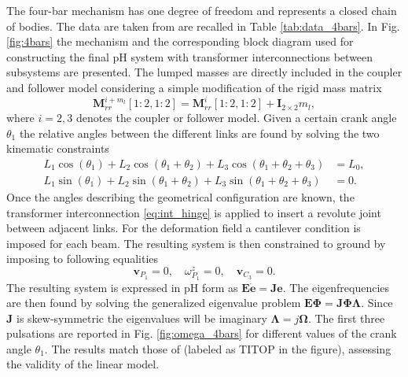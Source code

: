 \documentclass{svjour3}                     %
\newcommand{\firstRev}[1]{\textcolor{red!80!black}{#1}}
\begin{document}
	The four-bar mechanism has one degree of freedom and represents a closed chain of bodies. The data are taken from \cite{KITIS1990267,Chebbi2017} are recalled in Table \ref{tab:data_4bars}. In Fig. \ref{fig:4bars} the mechanism and the corresponding block diagram used for constructing the final pH system with transformer interconnections between subsystems are presented. The lumped masses are directly included in the coupler and follower model considering a simple modification of the rigid mass matrix
	\begin{equation*}
	\mathbf{M}_{rr}^{i + m_l}[1:2,1:2] = \mathbf{M}_{rr}^{i}[1:2,1:2] + \mathbf{I}_{2\times 2} m_l,
	\end{equation*} 
	where $i=2,3$ denotes the coupler or follower model. Given a certain crank angle $\theta_1$ the relative angles between the different links are found by solving the two kinematic constraints
	\begin{align*}
	L_1 \cos(\theta_1)+ L_2 \cos(\theta_1+\theta_2)+ L_3 \cos(\theta_1+\theta_2+\theta_3) &=L_0, \\
	L_1 \sin(\theta_1)+L_2 \sin(\theta_1+\theta_2)+L_3 \sin(\theta_1+\theta_2+\theta_3) &=0.
	\end{align*} 
	Once the angles describing the geometrical configuration are known, the transformer interconnection \eqref{eq:int_hinge} is applied to insert a revolute joint between adjacent links. For the deformation field a cantilever condition is imposed for each beam. The resulting system is then constrained to ground by imposing to following equalities
	\begin{equation*}
	\mathbf{v}_{P_1} = 0, \quad \omega^z_{P_1} = 0, \quad \mathbf{v}_{C_3} = 0.
	\end{equation*}
	The resulting system is expressed in pH form as $\mathbf{E}\dot{\mathbf{e}} = \mathbf{J} \mathbf{e}$. The eigenfrequencies are then found by solving the generalized eigenvalue problem $\mathbf{E}\bm{\Phi} = \mathbf{J} \bm{\Phi \Lambda}$. Since $\mathbf{J}$ is skew-symmetric the eigenvalues will be imaginary $\bm{\Lambda} = j \bm{\Omega}$. The first three pulsations  are reported in Fig. \ref{fig:omega_4bars} for different values of the crank angle $\theta_1$. \firstRev{The results match those of \cite{Chebbi2017} (labeled as TITOP in the figure), assessing the validity of the linear model.}
	
\end{document}
